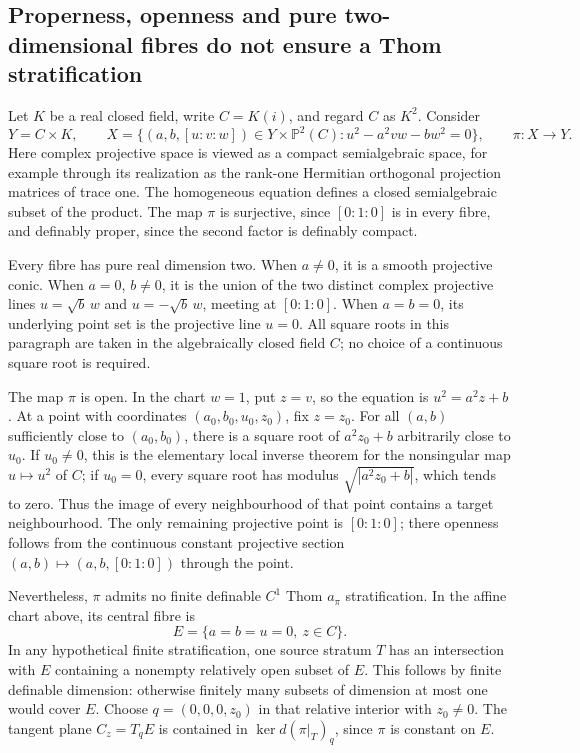 \subsection*{Properness, openness and pure two-dimensional fibres do not ensure a Thom stratification}

Let \(K\) be a real closed field, write \(C=K(i)\), and regard
\(C\) as \(K^2\).  Consider
\[
 Y=C\times K,\qquad
 X=\{(a,b,[u:v:w])\in Y\times\mathbb P^2(C):
                   u^2-a^2vw-bw^2=0\},
 \qquad \pi:X\longrightarrow Y.
 \tag{T.1}
\]
Here complex projective space is viewed as a compact semialgebraic
space, for example through its realization as the rank-one Hermitian
orthogonal projection matrices of trace one.  The homogeneous equation
defines a closed semialgebraic subset of the product.  The map \(\pi\)
is surjective, since \([0:1:0]\) is in every fibre, and definably proper,
since the second factor is definably compact.

Every fibre has pure real dimension two.  When \(a\ne0\), it is a smooth
projective conic.  When \(a=0\), \(b\ne0\), it is the union of the
two distinct complex projective lines
\(u=\sqrt b\,w\) and \(u=-\sqrt b\,w\), meeting at \([0:1:0]\).
When \(a=b=0\), its underlying point set is the projective line \(u=0\).
All square roots in this paragraph are taken in the algebraically
closed field \(C\); no choice of a continuous square root is required.

The map \(\pi\) is open.  In the chart \(w=1\), put \(z=v\), so the
equation is \(u^2=a^2z+b\).  At a point with coordinates
\((a_0,b_0,u_0,z_0)\), fix \(z=z_0\).  For all \((a,b)\) sufficiently
close to \((a_0,b_0)\), there is a square root of \(a^2z_0+b\)
arbitrarily close to \(u_0\).  If \(u_0\ne0\), this is the elementary
local inverse theorem for the nonsingular map \(u\mapsto u^2\)
of \(C\); if \(u_0=0\), every square root has modulus
\(\sqrt{|a^2z_0+b|}\), which tends to zero.  Thus the image of every
neighbourhood of that point contains a target neighbourhood.
The only remaining projective point is \([0:1:0]\); there openness
follows from the continuous constant projective section
\((a,b)\mapsto(a,b,[0:1:0])\) through the point.

Nevertheless, \(\pi\) admits no finite definable \(C^1\) Thom
\(a_\pi\) stratification.  In the affine chart above, its central
fibre is
\[
 E=\{a=b=u=0,\ z\in C\}.
\]
In any hypothetical finite stratification, one source stratum \(T\)
has an intersection with \(E\) containing a nonempty relatively open
subset of \(E\).  This follows by finite definable dimension: otherwise
finitely many subsets of dimension at most one would cover \(E\).
Choose \(q=(0,0,0,z_0)\) in that relative interior with \(z_0\ne0\).
The tangent plane \(C_z=T_qE\) is contained in
\(\ker d(\pi|_T)_q\), since \(\pi\) is constant on \(E\).

